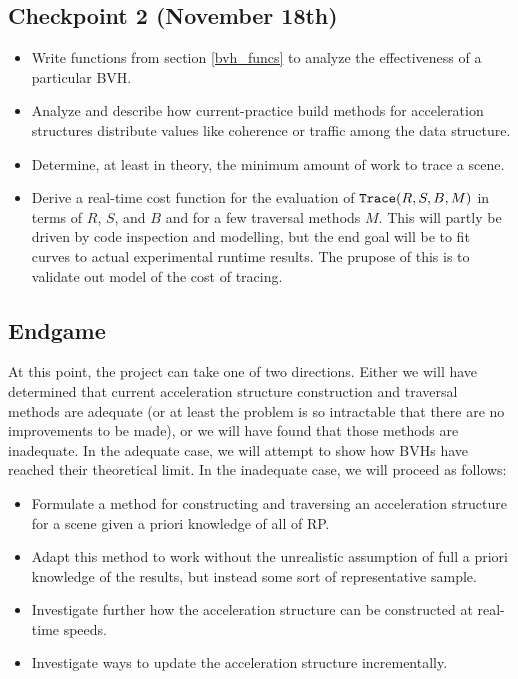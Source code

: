 \documentclass[twocolumn]{article}
\begin{document}
\subsection{Checkpoint 2 (November 18th)}
\begin{itemize}
\item Write functions from section \ref{bvh_funcs} to analyze the effectiveness of a particular BVH.
\item Analyze and describe how current-practice build methods for acceleration structures distribute values like coherence or traffic among the data structure.
\item Determine, at least in theory, the minimum amount of work to trace a scene.
\item Derive a real-time cost function for the evaluation of ${\tt Trace}(R, S, B, M)$ in terms of $R$, $S$, and $B$ and for a few traversal methods $M$. This will partly be driven by code inspection and modelling, but the end goal will be to fit curves to actual experimental runtime results.  The prupose of this is to validate out model of the cost of tracing.
\end{itemize}
\subsection{Endgame}
At this point, the project can take one of two directions. Either we will have determined that current acceleration structure construction and traversal methods are adequate (or at least the problem is so intractable that there are no improvements to be made), or we will have found that those methods are inadequate. In the adequate case, we will attempt to show how BVHs have reached their theoretical limit. In the inadequate case, we will proceed as follows:
\begin{itemize}
\item Formulate a method for constructing and traversing an acceleration structure for a scene given a priori knowledge of all of RP.
\item Adapt this method to work without the unrealistic assumption of full a priori knowledge of the results, but instead some sort of representative sample.
\item Investigate further how the acceleration structure can be constructed at real-time speeds.
\item Investigate ways to update the acceleration structure incrementally.
\end{itemize}
\end{document}
